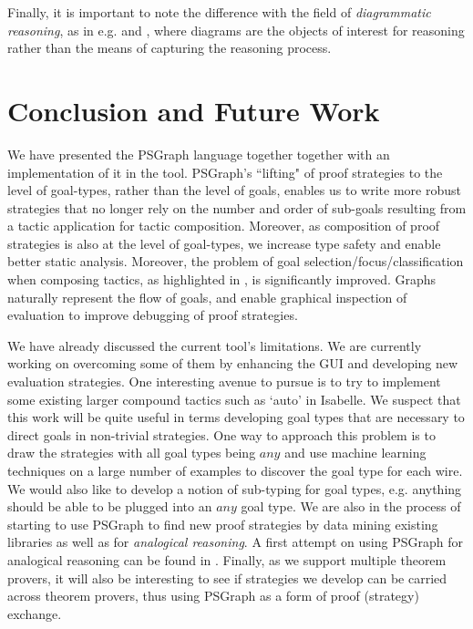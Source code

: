 \documentclass{llncs}
\begin{document}
Finally, it is important to note the difference with the field of \emph{diagrammatic reasoning}, as in e.g. \cite{Jamnik01} and \cite{KissingerThesis}, where diagrams are the objects of interest for reasoning rather than the means of capturing the reasoning process.

\beforesection
\section{Conclusion and Future Work}\label{sec:conc}
\aftersection

We have presented the PSGraph language together together with an implementation of it in the \psgraphtool{} tool. PSGraph's ``lifting" of proof strategies to the level of goal-types, rather than the level of goals,  enables us to write more robust
strategies that no longer rely on the number and order of sub-goals resulting from a tactic application for tactic composition. Moreover, as composition of proof strategies is also at the level of goal-types, we increase type safety and enable better static analysis. Moreover, the problem of goal selection/focus/classification when composing tactics, as highlighted in \cite{Asperti09}, is significantly improved. Graphs naturally represent the flow of goals, and enable graphical inspection of evaluation to improve debugging of proof strategies.

We have already discussed the current tool's limitations. We are currently working on overcoming some of them by
enhancing the GUI and developing new evaluation strategies. One interesting avenue to pursue is to try to implement some
existing larger compound tactics such as `auto' in Isabelle. We suspect that this work will be quite useful in terms
developing goal types that are necessary to direct goals in non-trivial strategies. One way to approach this problem is
to draw the strategies with all goal types being $any$ and use machine learning techniques on a large number of examples
to discover the goal type for each wire. We would also like to develop a notion of sub-typing for goal types, e.g.
anything should be able to be plugged into an $any$ goal type. We are also in the process of starting to use PSGraph to
find new proof strategies by data mining existing libraries as well as for \emph{analogical reasoning}. A first attempt
on using PSGraph for analogical reasoning can be found in \cite{grov13a}. Finally, as we support multiple theorem
provers, it will also be interesting to see if strategies we develop can be carried across theorem provers, thus using
PSGraph as a form of proof (strategy) exchange.
\end{document}
